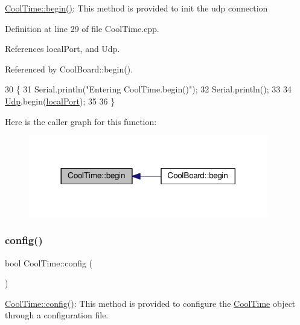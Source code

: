 \hyperlink{classCoolTime_ab1976cf718b950bc31e003c3323b8adb}{Cool\+Time\+::begin()}\+: This method is provided to init the udp connection 

Definition at line 29 of file Cool\+Time.\+cpp.



References local\+Port, and Udp.



Referenced by Cool\+Board\+::begin().


\begin{DoxyCode}
30 \{
31     Serial.println(\textcolor{stringliteral}{"Entering CoolTime.begin()"});
32     Serial.println();
33 
34     \hyperlink{classCoolTime_a4e23216a8121ca79d0fb019f30884b92}{Udp}.begin(\hyperlink{classCoolTime_a2f777da44d7ba678be8185299e9b49d1}{localPort});
35     
36 \}
\end{DoxyCode}
Here is the caller graph for this function\+:
\nopagebreak
\begin{figure}[H]
\begin{center}
\leavevmode
\includegraphics[width=296pt]{classCoolTime_ab1976cf718b950bc31e003c3323b8adb_icgraph}
\end{center}
\end{figure}
\mbox{\label{classCoolTime_a87c28260c1bc77091162cbcf1ee2e129}} 
\subsubsection{\texorpdfstring{config()}{config()}\hspace{0.1cm}{\footnotesize\ttfamily [1/2]}}
{\footnotesize\ttfamily bool Cool\+Time\+::config (\begin{DoxyParamCaption}{ }\end{DoxyParamCaption})}

\hyperlink{classCoolTime_a87c28260c1bc77091162cbcf1ee2e129}{Cool\+Time\+::config()}\+: This method is provided to configure the \hyperlink{classCoolTime}{Cool\+Time} object through a configuration file.


